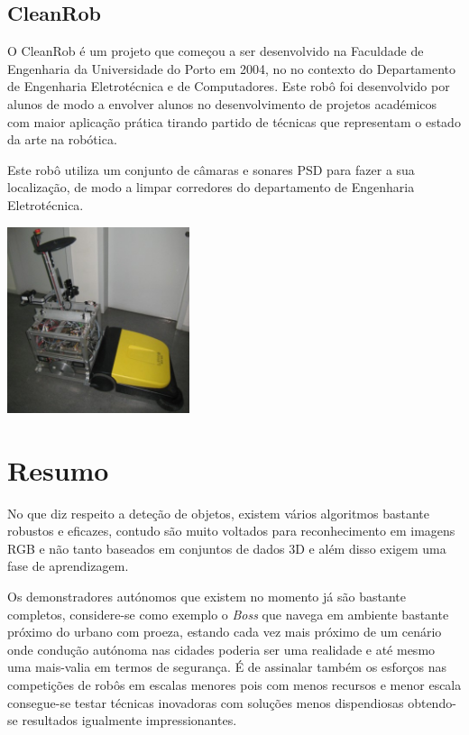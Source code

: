 \subsection{CleanRob}

O CleanRob é um projeto que começou a ser desenvolvido na Faculdade de Engenharia da Universidade do Porto em 2004, no no contexto do Departamento de Engenharia Eletrotécnica e de Computadores. Este robô foi desenvolvido por alunos de modo a envolver alunos no desenvolvimento de projetos académicos com maior aplicação prática tirando partido de técnicas que representam o estado da arte na robótica.

Este robô utiliza um conjunto de câmaras e sonares PSD para fazer a sua localização, de modo a limpar corredores do departamento de Engenharia Eletrotécnica.

\begin{center}
	\includegraphics[width=0.40\textwidth]{./figures/clean_rob.jpg}
	\label{fig:6}
\end{center}


\section{Resumo}

No que diz respeito a deteção de objetos, existem vários algoritmos bastante robustos e eficazes, contudo são muito voltados para reconhecimento em imagens RGB e não tanto baseados em conjuntos de dados 3D e além disso exigem uma fase de aprendizagem.

Os demonstradores autónomos que existem no momento já são bastante completos, considere-se como exemplo o \emph{Boss} que navega em ambiente bastante próximo do urbano com proeza,
estando cada vez mais próximo de um cenário onde condução autónoma nas cidades poderia ser
uma realidade e até mesmo uma mais-valia em termos de segurança. É de assinalar também os esforços
nas competições de robôs em escalas menores pois com menos recursos e menor escala consegue-se
testar técnicas inovadoras com soluções menos dispendiosas obtendo-se resultados igualmente
impressionantes.

